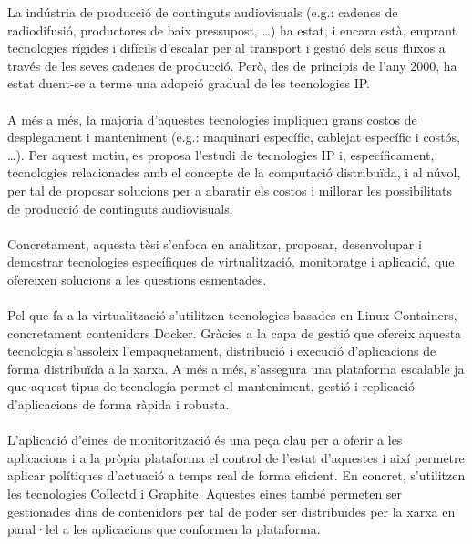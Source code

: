 \documentclass[english,final]{setup/eetac_tfc_pfc}
\begin{document}

\beforepreface  


\begin{resum}{10cm}
  La indústria de producció de continguts audiovisuals (e.g.: cadenes de radiodifusió, productores de baix pressupost, \ldots) ha estat, i encara està, emprant tecnologies rígides i difícils d'escalar per al transport i gestió dels seus fluxos a través de les seves cadenes de producció. Però, des de principis de l'any 2000, ha estat duent-se a terme una adopció gradual de les tecnologies IP.
  \\
  \\
  A més a més, la majoria d'aquestes tecnologies impliquen grans costos de desplegament i manteniment (e.g.: maquinari específic, cablejat específic i costós, \ldots). Per aquest motiu, es proposa l'estudi de tecnologies IP i, específicament, tecnologies relacionades amb el concepte de la computació distribuïda, i al núvol, per tal de proposar solucions per a abaratir els costos i millorar les possibilitats de producció de continguts audiovisuals.
  \\
  \\
  Concretament, aquesta tèsi s'enfoca en analitzar, proposar, desenvolupar i demostrar tecnologies específiques de virtualització, monitoratge i aplicació, que ofereixen solucions a les qüestions esmentades.
  \\
  \\
  Pel que fa a la virtualització s'utilitzen tecnologies basades en Linux Containers, concretament contenidors Docker. Gràcies a la capa de gestió que ofereix aquesta tecnología s'assoleix l'empaquetament, distribució i execució d'aplicacions de forma distribuïda a la xarxa. A més a més, s'assegura una plataforma escalable ja que aquest tipus de tecnología permet el manteniment, gestió i replicació d'aplicacions de forma ràpida i robusta.
  \\
  \\
  L'aplicació d'eines de monitorització és una peça clau per a oferir a les aplicacions i a la pròpia plataforma el control de l'estat d'aquestes i així permetre aplicar polítiques d'actuació a temps real de forma eficient. En concret, s'utilitzen les tecnologies Collectd i Graphite. Aquestes eines també permeten ser gestionades dins de contenidors per tal de poder ser distribuïdes per la xarxa en paral·lel a les aplicacions que conformen la plataforma. 

\end{resum}
\end{document}
